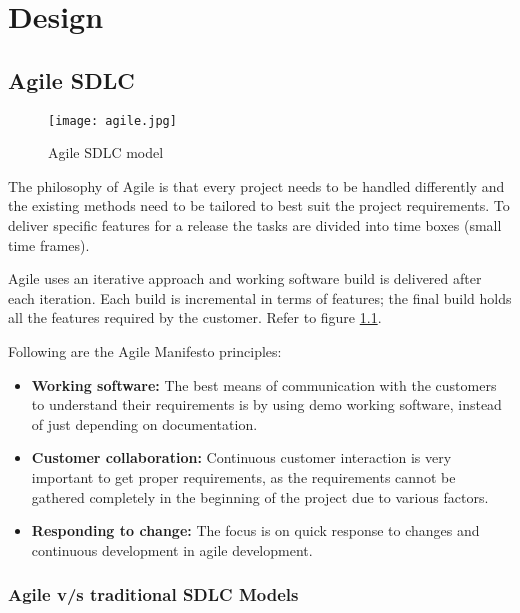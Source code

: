\chapter{Design}

\section{Agile SDLC}

\begin{figure}[h!]
    \begin{center}
        \texttt{[image: agile.jpg]}
    \end{center}
    \caption{Agile SDLC model}
    \label{fig:agile}
\end{figure}

The philosophy of Agile is that every project needs to be handled differently and the existing methods
need to be tailored to best suit the project requirements. To deliver specific features for a 
release the tasks are divided into time boxes (small time frames).

Agile uses an iterative approach and  working software build is delivered after each iteration. 
Each build is incremental in terms of features; the final build holds all the features required 
by the customer. Refer to figure \ref{fig:agile}.

Following are the Agile Manifesto principles:

\begin{itemize}
    \item \textbf{Working software:} The best means of communication with the customers to understand
    their requirements is by using demo working software, instead of just depending on documentation.
     
    \item \textbf{Customer collaboration:} Continuous customer interaction is very important to get proper
    requirements, as the requirements cannot be gathered completely in the beginning of the project due 
    to various factors.

    \item \textbf{Responding to change:} The focus is on quick response to changes and 
    continuous development in agile development.
\end{itemize}

\subsection{Agile v/s traditional SDLC Models}

